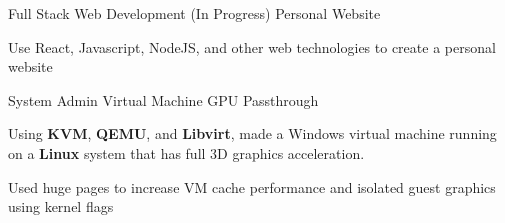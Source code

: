 


\begin{cventries}


\cventry
{Full Stack Web Development (In Progress)} %
{Personal Website} %
{}%
{}%
{ %
  \begin{cvitems}
    \item{Use React, Javascript, NodeJS, and other web technologies to create a personal website}
  \end{cvitems}
}
\cventry
{System Admin} %
{Virtual Machine GPU Passthrough } %
{}%
{}%
{ %
  \begin{cvitems}
  \item{Using \textbf{KVM}, \textbf{QEMU}, and \textbf{Libvirt}, made   a Windows virtual machine running on a \textbf{Linux} system that has full 3D graphics acceleration.}
  \item{Used huge pages to increase VM cache performance and isolated guest graphics using kernel flags}
  \end{cvitems}
}


\end{cventries}
